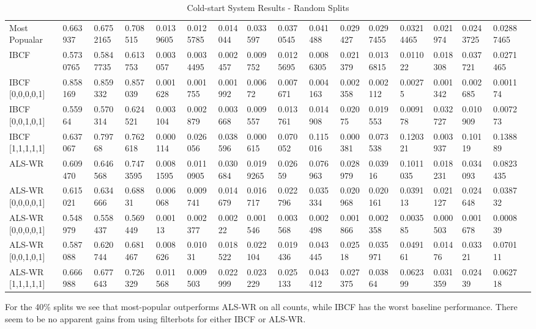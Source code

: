 \begin{table}[H]
{\begin{tabular}{*{17}{l}}
\rowcolor{Gray}
Most Popualar 		& 0.663937&	0.6752165&	0.708515&	0.0139605&	0.0125785&	0.014044&	0.033597&	0.0370545&	0.041488&	0.029427&	0.0297455&	0.03214465&	0.021974&	0.0243725&	0.02887465 & \\
\rowcolor{Gray}
IBCF 			 	& 0.5730765&	0.5847735&	0.613753&	0.003057&	0.0034495&	0.002457&	0.009752&	0.0125695&	0.0086305&	0.021379&	0.0136815&	0.011022&	0.018308&	0.037721&	0.0271465 & \\
IBCF [0,0,0,0,1] 	& 0.858169 &	0.859332&	0.857039&	0.001628&	0.001755&	0.001992&	0.00672	&	0.007671&	0.004163&	0.002358&	0.002112&	0.00275	&	0.001342&	0.002685&	0.001174	& \\
IBCF [0,0,1,0,1] 	& 0.55964  &	0.570314&	0.624521&	0.003104&	0.002879&	0.003668&	0.009557&	0.013761&	0.014908&	0.02075	&	0.019553&	0.009178&	0.032727&	0.010909&	0.007273 & \\
IBCF [1,1,1,1,1] 	& 0.637067 &	0.79768 &	0.762618&	0.000114&	0.026056&	0.038596&	0.000615&	0.070052&	0.115016&	0.000381&	0.073538&	0.120321&	0.003937&	0.10119	&	0.138889	& \\
\rowcolor{Gray}
ALS-WR			   	& 0.609470& 0.646568&	0.7473595&	0.0081595&	0.0110905&	0.030684&	0.0199265&	0.02659	&	0.076963&	0.028979&	0.03916	&	0.1011035&	0.018231&	0.034093&	0.0823435& \\
ALS-WR [0,0,0,0,1] 	& 0.615021&	0.634666&	0.68831&	0.006068&	0.009741&	0.014679&	0.016717&	0.022796&	0.035334&	0.020968&	0.020161&	0.039113&	0.021127&	0.024648&	0.038732	& \\
ALS-WR [0,0,0,0,1] 	& 0.548979&	0.558437&	0.569449&	0.00113	&	0.002377&	0.00222	&	0.001546&	0.003568&	0.002498&	0.001866&	0.002358&	0.003585&	0.000503&	0.001678&	0.000839& \\
ALS-WR [0,0,1,0,1]	& 0.587088& 0.620744&	0.681467&	0.008626&	0.01031	&	0.018522&	0.022104&	0.019436&	0.043445&	0.02518	&	0.035971&	0.049161&	0.01476&	0.03321&	0.070111 & \\
ALS-WR [1,1,1,1,1] 	& 0.666988& 0.677643&	0.726329&	0.011568&	0.009503&	0.022999&	0.023229&	0.025133&	0.043412&	0.027375&	0.03864	&	0.062399&	0.031359&	0.02439&	0.062718	& \\

\bottomrule
\end{tabular}
}
\caption{Cold-start System Results - Random Splits}
\end{table}

For the 40\% splits we see that most-popular outperforms ALS-WR on all counts, while IBCF has the worst baseline performance. There seem to be no apparent gains
from using filterbots for either IBCF or ALS-WR.

